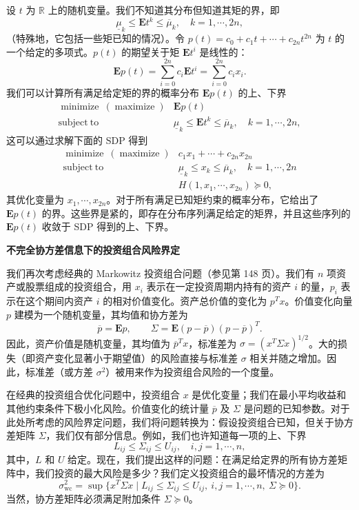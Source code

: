 \documentclass[UTF8, 12pt, fontset=fandol, oneside]{ctexart}
\begin{document}
设 $t$ 为 $\mathbb{R}$ 上的随机变量。我们不知道其分布但知道其矩的界，即
\[
\underline{\mu}_k\leq \mathbf{E}t^k\leq \overline{\mu}_k,\quad k=1,\cdots,2n,
\]
（特殊地，它包括一些矩已知的情况）。令 $p(t)=c_0+c_1t+\cdots+c_{2n}t^{2n}$ 为 $t$ 的一个给定的多项式。$p(t)$ 的期望关于矩 $\mathbf{E}t^i$ 是线性的：
\[
\mathbf{E}p(t)=\sum_{i=0}^{2n} c_i\mathbf{E}t^i=\sum_{i=0}^{2n}c_ix_i.
\]
我们可以计算所有满足给定矩的界的概率分布 $\mathbf{E}p(t)$ 的上、下界
\[
\begin{array}{ll}
\mathop{\mathrm{minimize}}\ (\mathop{\mathrm{maximize}}) & \mathbf{E}p(t)\\
\mathrm{subject\ to} & \underline{\mu}_k\leq \mathbf{E}t^k\leq \overline{\mu}_k,\quad k=1,\cdots,2n,
\end{array}
\]
这可以通过求解下面的 SDP 得到
\[
\begin{array}{ll}
\mathop{\mathrm{minimize}}\ (\mathop{\mathrm{maximize}}) & c_1x_1+\cdots+c_{2n}x_{2n}\\
\mathrm{subject\ to} & \underline{\mu}_k\leq x_k\leq \overline{\mu}_k,\quad k=1,\cdots,2n\\
& H(1,x_1,\cdots,x_{2n})\succeq 0,
\end{array}
\]
其优化变量为 $x_1,\cdots,x_{2n}$。对于所有满足已知矩约束的概率分布，它给出了 $\mathbf{E}p(t)$ 的界。这些界是紧的，即存在分布序列满足给定的矩界，并且这些序列的 $\mathbf{E}p(t)$ 收敛于 SDP 得到的上、下界。

\noindent\textbf{不完全协方差信息下的投资组合风险界定}

我们再次考虑经典的 Markowitz 投资组合问题（参见第 148 页）。我们有 $n$ 项资产或股票组成的投资组合，用 $x_i$ 表示在一定投资周期内持有的资产 $i$ 的量，$p_i$ 表示在这个期间内资产 $i$ 的相对价值变化。资产总价值的变化为 $p^Tx$。价值变化向量 $p$ 建模为一个随机变量，其均值和协方差为
\[
\overline{p}=\mathbf{E}p,\qquad \Sigma=\mathbf{E}(p-\overline{p})(p-\overline{p})^T.
\]
因此，资产价值是随机变量，其均值为 $\overline{p}^Tx$，标准差为 $\sigma=(x^T\Sigma x)^{1/2}$。大的损失（即资产变化显著小于期望值）的风险直接与标准差 $\sigma$ 相关并随之增加。因此，标准差（或方差 $\sigma^2$）被用来作为投资组合风险的一个度量。

在经典的投资组合优化问题中，投资组合 $x$ 是优化变量；我们在最小平均收益和其他约束条件下极小化风险。价值变化的统计量 $\overline{p}$ 及 $\Sigma$ 是问题的已知参数。对于此处所考虑的风险界定问题，我们将问题转换为：假设投资组合已知，但关于协方差矩阵 $\Sigma$，我们仅有部分信息。例如，我们也许知道每一项的上、下界
\[
L_{ij}\leq \Sigma_{ij}\leq U_{ij},\quad i,j=1,\cdots,n,
\]
其中，$L$ 和 $U$ 给定。现在，我们提出这样的问题：在满足给定界的所有协方差矩阵中，我们投资的最大风险是多少？我们定义投资组合的最坏情况的方差为
\[
\sigma_{\mathrm{wc}}^2=\sup\{x^T\Sigma x\mid L_{ij}\leq \Sigma_{ij}\leq U_{ij},\ i,j=1,\cdots,n,\ \Sigma\succeq 0\}.
\]
当然，协方差矩阵必须满足附加条件 $\Sigma\succeq 0$。
\end{document}
